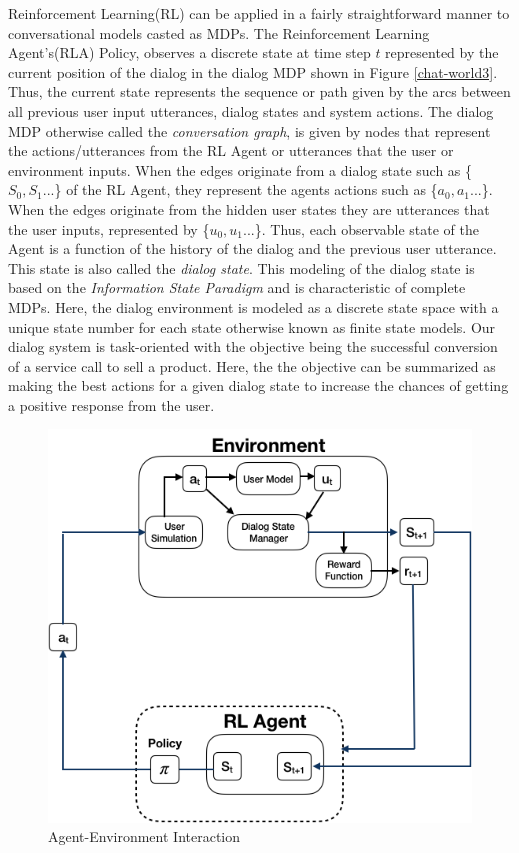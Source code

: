 \documentclass[12pt]{extarticle}
\numberwithin{equation}{section}
\begin{document}
	Reinforcement Learning(RL) can be applied in a fairly straightforward manner to conversational models casted as MDPs. The Reinforcement Learning Agent's(RLA) Policy, observes a discrete state at time step $t$ represented by the current position of the dialog in the dialog MDP shown in Figure \ref{chat-world3}. Thus, the current state represents the sequence or path given by the arcs between all previous user input utterances, dialog states and system actions. The dialog MDP otherwise called the \textit{conversation graph}, is given by nodes that represent the actions/utterances from the RL Agent or utterances that the user or environment inputs. When the edges originate from a dialog state such as \{$S_0,S_1...$\} of the RL Agent, they represent the agents actions such as \{$a_0,a_1...$\}. When the edges originate from the hidden user states they are utterances that the user inputs, represented by \{$u_0, u_1...$\}. Thus, each observable state of the Agent is a function of the history of the dialog and the previous user utterance. This state is also called the \textit{dialog state}. This modeling of the dialog state is based on the \textit{Information State Paradigm}\cite{Larsson:2000:ISD:973935.973943} and is characteristic of complete MDPs. Here, the dialog environment is modeled as a discrete state space with a unique state number for each state otherwise known as finite state models. Our dialog system is task-oriented with the objective being the successful conversion of a service call to sell a product. Here, the the objective can be summarized as making the best actions for a given dialog state to increase the chances of getting a positive response from the user.
	\begin{figure}[H]
		\includegraphics[scale=0.65]{user-env}
		\centering
		\caption{Agent-Environment Interaction
			\label{chat-world}}
	\end{figure}
\end{document}
